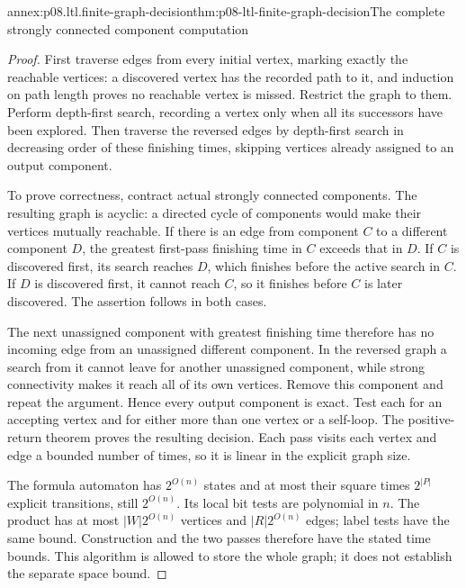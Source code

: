 \begin{annexitem}{annex:p08.ltl.finite-graph-decision}{thm:p08-ltl-finite-graph-decision}{The complete strongly connected component computation}
\begin{proof}
First traverse edges from every initial vertex, marking exactly
the reachable vertices: a discovered vertex has the recorded
path to it, and induction on path length proves no reachable
vertex is missed. Restrict the graph to them. Perform depth-first
search, recording a vertex only when all its successors have
been explored. Then traverse the reversed edges by depth-first
search in decreasing order of these finishing times, skipping
vertices already assigned to an output component.

To prove correctness, contract actual strongly connected
components. The resulting graph is acyclic: a directed cycle
of components would make their vertices mutually reachable.
If there is an edge from component \(C\) to a different
component \(D\), the greatest first-pass finishing time in
\(C\) exceeds that in \(D\). If \(C\) is discovered
first, its search reaches \(D\), which finishes before the
active search in \(C\). If \(D\) is discovered first, it
cannot reach \(C\), so it finishes before \(C\) is later
discovered. The assertion follows in both cases.

The next unassigned component with greatest finishing time
therefore has no incoming edge from an unassigned different
component. In the reversed graph a search from it cannot
leave for another unassigned component, while strong
connectivity makes it reach all of its own vertices.
Remove this component and repeat the argument. Hence every
output component is exact. Test each for an accepting vertex
and for either more than one vertex or a self-loop. The
positive-return theorem proves the resulting decision.
Each pass visits each vertex and edge a bounded number of
times, so it is linear in the explicit graph size.

The formula automaton has \(2^{O(n)}\) states and at most
their square times \(2^{|P|}\) explicit transitions, still
\(2^{O(n)}\). Its local bit tests are polynomial in \(n\).
The product has at most \(|W|2^{O(n)}\) vertices and
\(|R|2^{O(n)}\) edges; label tests have the same bound.
Construction and the two passes therefore have the stated
time bounds. This algorithm is allowed to store the whole
graph; it does not establish the separate space bound.
\end{proof}
\end{annexitem}

